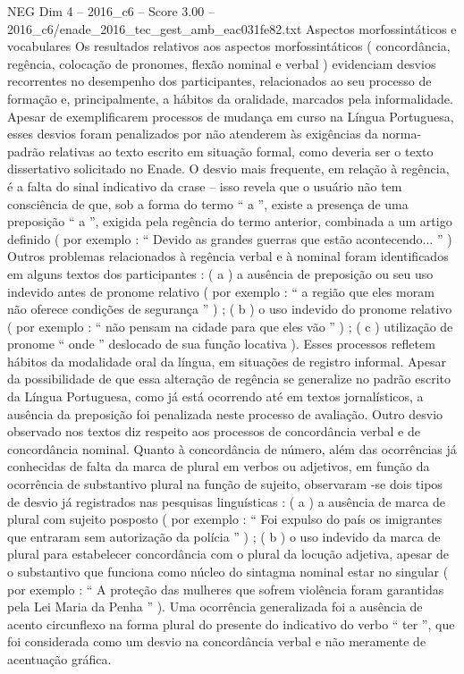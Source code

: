 \begin{textsample}{NEG Dim 4 – 2016\_c6 – Score 3.00 – 2016\_c6/enade\_2016\_tec\_gest\_amb\_eac031fe82.txt}
Aspectos morfossintáticos e vocabulares Os resultados relativos aos aspectos morfossintáticos ( concordância, regência, colocação de pronomes, flexão nominal e verbal ) evidenciam desvios recorrentes no desempenho dos participantes, relacionados ao seu processo de formação e, principalmente, a hábitos da oralidade, marcados pela informalidade.
Apesar de exemplificarem processos de mudança em curso na Língua Portuguesa, esses desvios foram penalizados por não atenderem às exigências da norma-padrão relativas ao texto escrito em situação formal, como deveria ser o texto dissertativo solicitado no Enade.
O desvio mais frequente, em relação à regência, é a falta do sinal indicativo da crase – isso revela que o usuário não tem consciência de que, sob a forma do termo “ a ”, existe a presença de uma preposição “ a ”, exigida pela regência do termo anterior, combinada a um artigo definido ( por exemplo : “ Devido as grandes guerras que estão acontecendo... ” ) Outros problemas relacionados à regência verbal e à nominal foram identificados em alguns textos dos participantes : ( a ) a ausência de preposição ou seu uso indevido antes de pronome relativo ( por exemplo : “ a região que eles moram não oferece condições de segurança ” ) ; ( b ) o uso indevido do pronome relativo ( por exemplo : “ não pensam na cidade para que eles vão ” ) ; ( c ) utilização de pronome “ onde ” deslocado de sua função locativa ).
Esses processos refletem hábitos da modalidade oral da língua, em situações de registro informal.
Apesar da possibilidade de que essa alteração de regência se generalize no padrão escrito da Língua Portuguesa, como já está ocorrendo até em textos jornalísticos, a ausência da preposição foi penalizada neste processo de avaliação.
Outro desvio observado nos textos diz respeito aos processos de concordância verbal e de concordância nominal.
Quanto à concordância de número, além das ocorrências já conhecidas de falta da marca de plural em verbos ou adjetivos, em função da ocorrência de substantivo plural na função de sujeito, observaram -se dois tipos de desvio já registrados nas pesquisas linguísticas : ( a ) a ausência de marca de plural com sujeito posposto ( por exemplo : “ Foi expulso do país os imigrantes que entraram sem autorização da polícia ” ) ; ( b ) o uso indevido da marca de plural para estabelecer concordância com o plural da locução adjetiva, apesar de o substantivo que funciona como núcleo do sintagma nominal estar no singular ( por exemplo : “ A proteção das mulheres que sofrem violência foram garantidas pela Lei Maria da Penha ” ).
Uma ocorrência generalizada foi a ausência de acento circunflexo na forma plural do presente do indicativo do verbo “ ter ”, que foi considerada como um desvio na concordância verbal e não meramente de acentuação gráfica.

\end{textsample}
